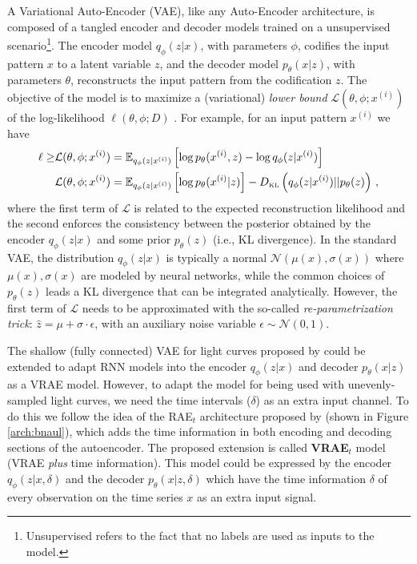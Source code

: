 A Variational Auto-Encoder (VAE), like any Auto-Encoder architecture, is composed of a tangled encoder and decoder models trained on a unsupervised scenario\footnote{Unsupervised refers to the fact that no labels are used as inputs to the model.}. The encoder model $q_{\phi}(z|x)$, with parameters $\phi$, codifies the input pattern $x$ to a latent variable $z$, and the decoder model $p_\theta(x|z)$, with parameters $\theta$, reconstructs the input pattern from the codification $z$. The objective of the model is to maximize a (variational) \textit{lower bound} $\mathcal{L}(\theta,\phi; x^{(i)})$ of the log-likelihood $\ell(\theta,\phi; D)$ \citep{kingma2013auto}. For example, for an input pattern $x^{(i)}$ we have
\begin{align} \label{eq:basic_obj}
\ell \geq & \mathcal{L}(\theta,\phi; x^{(i)}) = \mathbb{E}_{q_{\phi}(z |x^{(i)})}\left[\log{p_{\theta}(x^{(i)},z)} -\log{q_{\phi}(z|x^{(i)})}  \right] \, \notag \\
    & \mathcal{L}(\theta,\phi; x^{(i)}) =  \mathbb{E}_{q_{\phi}(z |x^{(i)})}\left[ \log{p_{\theta}( x^{(i)} | z )}\right] - D_{\mbox{\tiny KL}}\left( q_{\phi}(z | x^{(i)}) || p_{\theta} (z)  \right) \, ,
\end{align}
where the first term of $\mathcal{L}$ is related to the expected reconstruction likelihood and the second enforces the consistency between the posterior obtained by the encoder $q_{\phi}(z|x)$ and some prior $p_\theta(z)$ (i.e., KL divergence). In the standard VAE, the distribution $q_{\phi}(z|x)$ is typically a normal $\mathcal{N}(\mu(x),\sigma(x))$ where $\mu(x), \sigma(x)$ are modeled by neural networks, while the common choices of $p_\theta(z)$ leads a KL divergence that can be integrated analytically. However, the first term of $\mathcal{L}$ needs to be approximated with the so-called \emph{re-parametrization trick}: $\hat{z} = \mu + \sigma \cdot \epsilon$, with an auxiliary noise variable $\epsilon\sim \mathcal{N}(0,1)$.

The shallow (fully connected) VAE for light curves proposed by \citep{woodward2019generating} could be extended to adapt RNN models into the encoder $q_{\phi}(z|x)$ and decoder $p_\theta(x|z)$ as a VRAE model.
However, to adapt the model for being used with unevenly-sampled light curves, we need the time intervals ($\delta$) as an extra input channel. 
To do this we follow the idea of the RAE$_t$ architecture proposed by \citep{naul2018recurrent} (shown in Figure \ref{arch:bnaul}), which adds the time information in both encoding and decoding sections of the autoencoder.
The proposed extension is called \textbf{VRAE$_t$} model (VRAE \textit{plus} time information). This model could be expressed by the encoder $q_{\phi}(z|x,\delta)$ and the decoder $p_\theta(x|z,\delta)$ which have the time information $\delta$ of every observation on the time series $x$ as an extra input signal.

